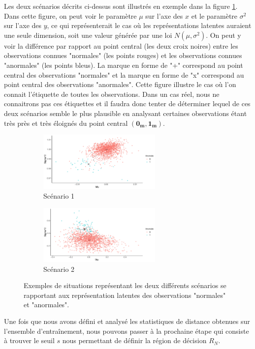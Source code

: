 Les deux scénarios décrits ci-dessus sont illustrés en exemple dans la figure \ref{fig:scenarios}. Dans cette figure, on peut voir le paramètre $\mu$ sur l'axe des $x$ et le paramètre $\sigma^2$ sur l'axe des $y$, ce qui représenterait le cas où les représentations latentes auraient une seule dimension, soit une valeur générée par une loi $N(\mu, \sigma^2)$. On peut y voir la différence par rapport au point central (les deux croix noires) entre les observations connues "normales" (les points rouges) et les observations connues "anormales" (les points bleus).  La marque en forme de "+" correspond au point central des observations "normales" et la marque en forme de "x" correspond au point central des observations "anormales". Cette figure illustre le cas où l'on connait l'étiquette de toutes les observations. Dans un cas réel, nous ne connaitrons pas ces étiquettes et il faudra donc tenter de déterminer lequel de ces deux scénarios semble le plus plausible en analysant certaines observations étant très près et très éloignés du point central $(\boldsymbol{0_m}, \boldsymbol{1_m})$.

\begin{figure} [h]
	\centering
	\begin{subfigure}{6cm}
		\includegraphics[width=6cm]{images/plot_near.pdf}
		\caption{Scénario 1}
	\end{subfigure}
	\begin{subfigure}{6cm}
		\includegraphics[width=6cm]{images/plot_away.pdf}
		\caption{Scénario 2}
	\end{subfigure}
	\caption{Exemples de situations représentant les deux différents scénarios se rapportant  aux représentation latentes des observations "normales" et "anormales".}
	\label{fig:scenarios}
\end{figure}

Une fois que nous avons défini et analysé les statistiques de distance obtenues sur l'ensemble d'entraînement, nous pouvons passer à la prochaine étape qui consiste à trouver le seuil $s$ nous permettant de définir la région de décision $R_N$.

